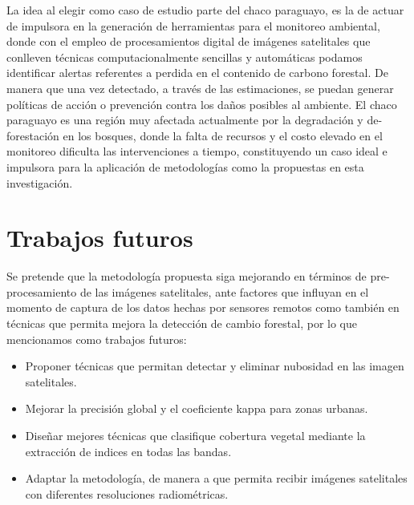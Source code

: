 La idea al elegir como caso de estudio parte del chaco paraguayo, es la de actuar de impulsora en la generaci\'on de herramientas para el monitoreo ambiental, donde con el empleo de procesamientos digital de im\'agenes satelitales que conlleven t\'ecnicas computacionalmente sencillas y autom\'aticas podamos identificar alertas referentes a perdida en el contenido de carbono forestal. De manera que una vez detectado, a trav\'es de las estimaciones, se puedan generar pol\'iticas de acci\'on o prevenci\'on contra los da\~{n}os posibles al ambiente. El chaco paraguayo es una regi\'on muy afectada actualmente por la degradaci\'on y de-forestaci\'on en los bosques, donde la falta de recursos y el costo  elevado en el monitoreo dificulta las intervenciones a tiempo, constituyendo un caso ideal e impulsora para la aplicaci\'on de metodolog\'ias como la propuestas en esta investigaci\'on.



\section{Trabajos futuros}
Se pretende que la metodolog\'ia propuesta siga mejorando en t\'erminos de pre-procesamiento de las im\'agenes satelitales, ante factores que influyan en el momento de captura de los datos hechas por sensores remotos como tambi\'en en t\'ecnicas que permita mejora la detecci\'on de cambio forestal, por lo que mencionamos como trabajos futuros:
\begin{itemize}
\item Proponer t\'ecnicas que permitan detectar y eliminar nubosidad en las imagen satelitales.
\item Mejorar la precisi\'on global y el coeficiente kappa para zonas urbanas.
\item Dise\~{n}ar mejores t\'ecnicas que clasifique cobertura vegetal mediante la extracci\'on de indices en todas las bandas.
\item Adaptar la metodolog\'ia, de manera a que permita recibir im\'agenes satelitales con diferentes resoluciones radiom\'etricas.

\end{itemize}
